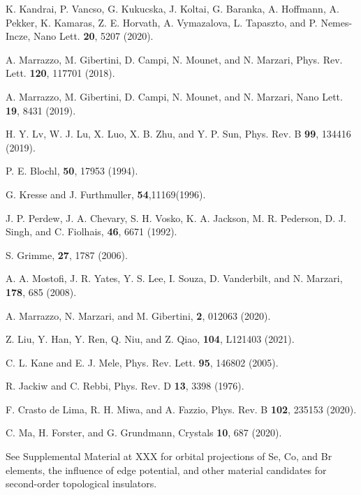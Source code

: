 \documentclass[aps,prl,twocolumn,showpacs,superscriptaddress]{revtex4-1}
\begin{document}
\begin{thebibliography}{99}
K. Kandrai, P. Vancso, G. Kukucska, J. Koltai, G. Baranka, A. Hoffmann, A. Pekker, K. Kamaras, Z. E. Horvath, A. Vymazalova, L. Tapaszto, and P. Nemes-Incze, Nano Lett. \textbf{20}, 5207 (2020).

A. Marrazzo, M. Gibertini, D. Campi, N. Mounet, and N. Marzari, Phys. Rev. Lett. \textbf{120}, 117701 (2018).

A. Marrazzo, M. Gibertini, D. Campi, N. Mounet, and N. Marzari, Nano Lett. \textbf{19}, 8431 (2019).

H. Y. Lv, W. J. Lu, X. Luo, X. B. Zhu, and Y. P. Sun, Phys. Rev. B \textbf{99}, 134416 (2019).

P. E. Blochl,  \textbf{50}, 17953 (1994).
		
G. Kresse and J. Furthmuller,  \textbf{54},11169(1996).
		
J. P. Perdew, J. A. Chevary, S. H. Vosko, K. A. Jackson, M. R. Pederson, D. J. Singh, and C. Fiolhais,  \textbf{46}, 6671 (1992).
		
S. Grimme,  \textbf{27}, 1787 (2006).

A. A. Mostofi, J. R. Yates, Y. S. Lee, I. Souza, D. Vanderbilt, and N. Marzari,  \textbf{178}, 685 (2008).

A. Marrazzo, N. Marzari, and M. Gibertini,  \textbf{2}, 012063 (2020).

Z. Liu, Y. Han, Y. Ren, Q. Niu, and Z. Qiao,  \textbf{104}, L121403 (2021).


C. L. Kane and E. J. Mele, Phys. Rev. Lett. \textbf{95}, 146802 (2005).

R. Jackiw and C. Rebbi, Phys. Rev. D \textbf{13}, 3398 (1976).

F. Crasto de Lima, R. H. Miwa, and A. Fazzio, Phys. Rev. B \textbf{102}, 235153 (2020).

C. Ma, H. Forster, and G. Grundmann, Crystals \textbf{10}, 687 (2020).

See Supplemental Material at XXX for orbital projections of Se, Co, and Br elements, the influence of edge potential, and other material candidates for second-order topological insulators.


\end{thebibliography}
\end{document}

